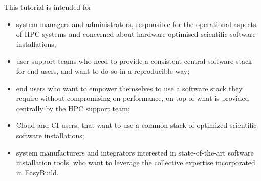This tutorial is intended for
\begin{itemize}
    \item system managers and administrators, responsible for the operational aspects of HPC systems and concerned about hardware optimised scientific software installations;
    \item user support teams who need to provide a consistent central software stack for end users, and want to do so in a reproducible way;
    \item end users who want to empower themselves to use a software stack they require without compromising on performance, on top of what is provided centrally by the HPC support team;
    \item Cloud and CI users, that want to use a common stack of optimized scientific software installations;
    \item system manufacturers and integrators interested in state-of-the-art software installation tools, who want to leverage the collective expertise incorporated in EasyBuild.
\end{itemize}
